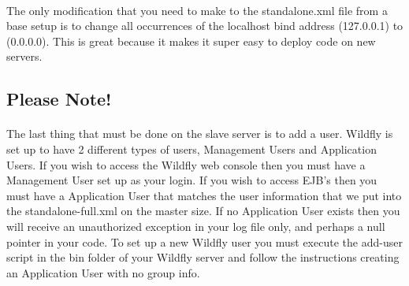 \documentclass[
10pt, %
letterpaper, %
oneside, %
headinclude,footinclude, %
BCOR5mm, %
]{scrartcl}
\begin{document}
\paragraph{} The only modification that you need to make to the standalone.xml file from a base setup is to change all occurrences of the localhost bind address (127.0.0.1) to (0.0.0.0). This is great because it makes it super easy to deploy code on new servers.


\subsection{Please Note!}


\paragraph{} The last thing that must be done on the slave server is to add a user. Wildfly is set up to have 2 different types of users, Management Users and Application Users. If you wish to access the Wildfly web console then you must have a Management User set up as your login. If you wish to access EJB's then you must have a Application User that matches the user information that we put into the standalone-full.xml on the master size. If no Application User exists then you will receive an unauthorized exception in your log file only, and perhaps a null pointer in your code. To set up a new Wildfly user you must execute the add-user script in the bin folder of your Wildfly server and follow the instructions creating an Application User with no group info.
\end{document}
